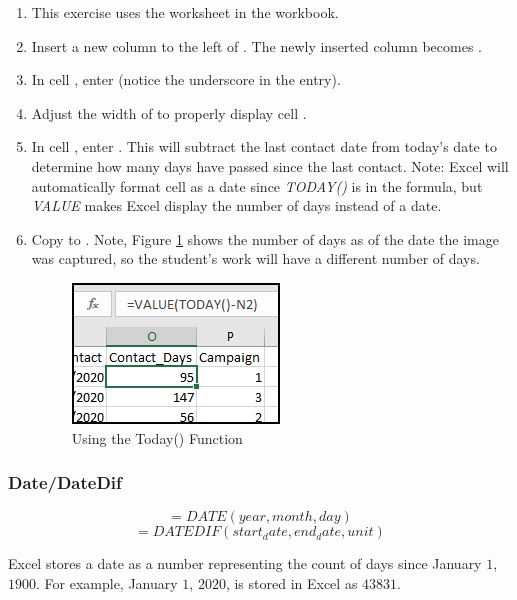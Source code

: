\begin{enumbox}
	\begin{enumerate}
		\item This exercise uses the  worksheet in the  workbook.
		\item Insert a new column to the left of . The newly inserted column becomes .
		\item In cell , enter  (notice the underscore in the entry).
		\item Adjust the width of  to properly display cell .
		\item In cell , enter . This will subtract the last contact date from today's date to determine how many days have passed since the last contact. Note: Excel will automatically format cell  as a date since \textit{TODAY()} is in the formula, but \textit{VALUE} makes Excel display the number of days instead of a date.
		\item Copy  to . Note, Figure \ref{09:fig45} shows the number of days as of the date the image was captured, so the student's work will have a different number of days.
		
		\begin{figure}[H]
			\centering
			\includegraphics[width=\maxwidth{.50\linewidth}]{gfx/ch09_fig45}
			\caption{Using the Today() Function}
			\label{09:fig45}
		\end{figure}
		
	\end{enumerate}
\end{enumbox}
	
\subsubsection{Date/DateDif}

\[ =DATE(year, month, day) \]
\[ =DATEDIF (start_date, end_date, unit) \]

Excel stores a date as a number representing the count of days since January $ 1 $, $ 1900 $. For example, January $ 1 $, $ 2020 $, is stored in Excel as $ 43831 $.

